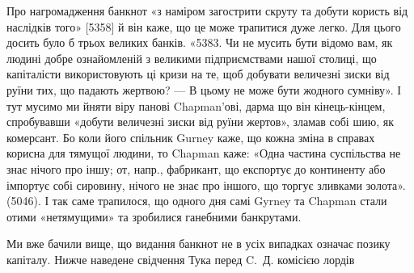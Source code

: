 Про нагромадження банкнот «з наміром загострити скруту та добути
користь від наслідків того» [5358] й він каже, що це може трапитися дуже
легко. Для цього досить було б трьох великих банків. «5383. Чи не мусить
бути відомо вам, як людині добре ознайомленій з великими підприємствами
нашої столиці, що капіталісти використовують ці кризи на те, щоб добувати
величезні зиски від руїни тих, що падають жертвою? — В цьому не може
бути жодного сумніву». І тут мусимо ми йняти віру панові Chapman’ові, дарма
що він кінець-кінцем, спробувавши «добути величезні зиски від руїни жертов»,
зламав собі шию, як комерсант. Бо коли його спільник Gurney каже, що кожна
зміна в справах корисна для тямущої людини, то Chapman каже: «Одна
частина суспільства не знає нічого про іншу; от, напр., фабрикант, що експортує
до континенту або імпортує собі сировину, нічого не знає про іншого,
що торгує зливками золота». (5046). І так саме трапилося, що одного дня
самі Gyrney та Chapman стали отими «нетямущими» та зробилися ганебними
банкрутами.

Ми вже бачили вище, що видання банкнот не в усіх випадках означає
позику капіталу. Нижче наведене свідчення Тука перед C.~Д. комісією лордів
\parbreak{}  %
